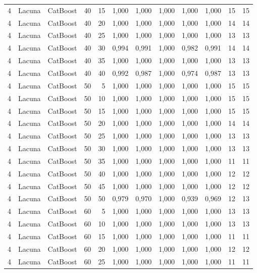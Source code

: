 \begin{longtable}{@{}rllrrrrrrrrr@{}}
4 & Lacuna & CatBoost & 40 & 15 & 1,000 & 1,000 & 1,000 & 1,000 & 1,000 & 15 & 15 \\
4 & Lacuna & CatBoost & 40 & 20 & 1,000 & 1,000 & 1,000 & 1,000 & 1,000 & 14 & 14 \\
4 & Lacuna & CatBoost & 40 & 25 & 1,000 & 1,000 & 1,000 & 1,000 & 1,000 & 13 & 13 \\
4 & Lacuna & CatBoost & 40 & 30 & 0,994 & 0,991 & 1,000 & 0,982 & 0,991 & 14 & 14 \\
4 & Lacuna & CatBoost & 40 & 35 & 1,000 & 1,000 & 1,000 & 1,000 & 1,000 & 13 & 13 \\
4 & Lacuna & CatBoost & 40 & 40 & 0,992 & 0,987 & 1,000 & 0,974 & 0,987 & 13 & 13 \\
4 & Lacuna & CatBoost & 50 & 5 & 1,000 & 1,000 & 1,000 & 1,000 & 1,000 & 15 & 15 \\
4 & Lacuna & CatBoost & 50 & 10 & 1,000 & 1,000 & 1,000 & 1,000 & 1,000 & 15 & 15 \\
4 & Lacuna & CatBoost & 50 & 15 & 1,000 & 1,000 & 1,000 & 1,000 & 1,000 & 15 & 15 \\
4 & Lacuna & CatBoost & 50 & 20 & 1,000 & 1,000 & 1,000 & 1,000 & 1,000 & 14 & 14 \\
4 & Lacuna & CatBoost & 50 & 25 & 1,000 & 1,000 & 1,000 & 1,000 & 1,000 & 13 & 13 \\
4 & Lacuna & CatBoost & 50 & 30 & 1,000 & 1,000 & 1,000 & 1,000 & 1,000 & 13 & 13 \\
4 & Lacuna & CatBoost & 50 & 35 & 1,000 & 1,000 & 1,000 & 1,000 & 1,000 & 11 & 11 \\
4 & Lacuna & CatBoost & 50 & 40 & 1,000 & 1,000 & 1,000 & 1,000 & 1,000 & 12 & 12 \\
4 & Lacuna & CatBoost & 50 & 45 & 1,000 & 1,000 & 1,000 & 1,000 & 1,000 & 12 & 12 \\
4 & Lacuna & CatBoost & 50 & 50 & 0,979 & 0,970 & 1,000 & 0,939 & 0,969 & 12 & 13 \\
4 & Lacuna & CatBoost & 60 & 5 & 1,000 & 1,000 & 1,000 & 1,000 & 1,000 & 13 & 13 \\
4 & Lacuna & CatBoost & 60 & 10 & 1,000 & 1,000 & 1,000 & 1,000 & 1,000 & 13 & 13 \\
4 & Lacuna & CatBoost & 60 & 15 & 1,000 & 1,000 & 1,000 & 1,000 & 1,000 & 11 & 11 \\
4 & Lacuna & CatBoost & 60 & 20 & 1,000 & 1,000 & 1,000 & 1,000 & 1,000 & 12 & 12 \\
4 & Lacuna & CatBoost & 60 & 25 & 1,000 & 1,000 & 1,000 & 1,000 & 1,000 & 11 & 11 \\

\end{longtable}

